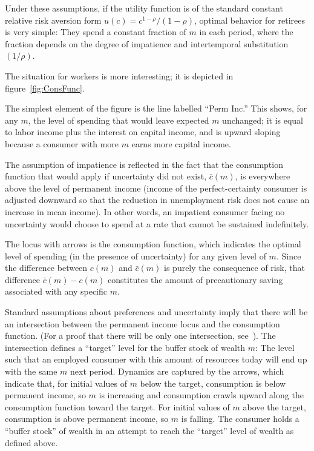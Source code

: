 Under these assumptions, if the utility function is of the standard constant relative risk aversion form
$u(c)=c^{1-\rho}/(1-\rho)$, optimal behavior for retirees is very simple: They spend a constant
fraction of ${m}$ in each period, where the fraction depends on the degree of impatience and 
intertemporal substitution $(1/\rho)$.

The situation for workers is more interesting; it is depicted in
figure~\ref{fig:ConsFunc}.

The simplest element of the figure is the line labelled ``Perm Inc.'' This shows, for any ${m}$, the
level of spending that would leave expected ${m}$ unchanged; it is equal to labor income plus the interest on
capital income, and is upward sloping because a consumer with more ${m}$ earns more capital income.

The assumption of impatience is reflected in the fact that the
consumption function that would apply if uncertainty did not exist,
$\bar{c}({m})$, is everywhere above the level of permanent income
(income of the perfect-certainty consumer is adjusted downward so that
the reduction in unemployment risk does not cause an increase in mean
income).  In other words, an impatient consumer facing no uncertainty
would choose to spend at a rate that cannot be sustained indefinitely.

The locus with arrows is the consumption function, which indicates the
optimal level of spending (in the presence of uncertainty) for any
given level of ${m}$.  Since the difference between ${c}({m})$ and
$\bar{c}({m})$ is purely the consequence of risk, that difference
$\bar{c}({m})-{c}({m})$ constitutes the amount of precautionary saving
associated with any specific ${m}$.

Standard assumptions about preferences and uncertainty imply that
there will be an intersection between the permanent income locus and
the consumption function.  (For a proof that there will be only one
intersection, see~\cite{BufferStockTheory}).  The intersection defines
a ``target'' level for the buffer stock of wealth ${m}$: The level such that an employed consumer
with this amount of resources today will end up with the same $m$ next period.  
Dynamics are captured by the
arrows, which indicate that, for initial
values of ${m}$ below the target, consumption is below permanent
income, so $m$ is increasing and consumption crawls upward along the
consumption function toward the target.  For initial values of
${m}$ above the target, consumption is above permanent income, so $m$
is falling.  The consumer holds a ``buffer stock'' of wealth in an attempt
to reach the ``target'' level of wealth as defined above.  

